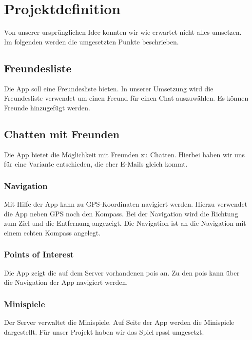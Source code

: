\chapter{Projektdefinition}
Von unserer ursprünglichen Idee konnten wir wie erwartet nicht alles umsetzen. Im folgenden werden die umgesetzten Punkte beschrieben.

\section{Freundesliste}
Die App soll eine Freundesliste bieten. In unserer Umsetzung wird die Freundesliste verwendet um einen Freund für einen Chat auszuwählen. Es können Freunde hinzugefügt werden.

\section{Chatten mit Freunden}
Die App bietet die Möglichkeit mit Freunden zu Chatten. Hierbei haben wir uns für eine Variante entschieden, die eher E-Mails gleich kommt.

\subsection{Navigation}
Mit Hilfe der App kann zu GPS-Koordinaten navigiert werden. Hierzu verwendet die App neben GPS noch den Kompass. Bei der Navigation wird die Richtung zum Ziel und die Entfernung angezeigt. Die Navigation ist an die Navigation mit einem echten Kompass angelegt.

\subsection{Points of Interest}
Die App zeigt die auf dem Server vorhandenen \glspl{poi} an. Zu den \glspl{poi} kann über die Navigation der App navigiert werden.

\subsection{Minispiele}
Der Server verwaltet die Minispiele. Auf Seite der App werden die Minispiele dargestellt. Für unser Projekt haben wir das Spiel \gls{rpssl} umgesetzt.